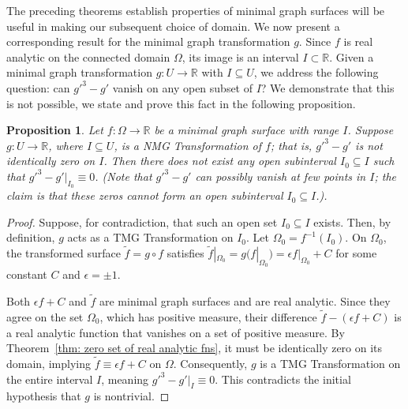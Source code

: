 \documentclass[12pt]{article}
\theoremstyle{plain}
\newtheorem{proposition}[theorem]{Proposition}
\theoremstyle{definition}
\theoremstyle{remark}
\begin{document}
  The preceding theorems establish properties of minimal graph surfaces will be useful in making our subsequent choice of domain. We now present a corresponding result for the minimal graph transformation \(g\). Since \(f\) is real analytic on the connected domain \(\Omega\), its image is an interval \(I \subset \mathbb{R}\). Given a minimal graph transformation \(g : U \longrightarrow \mathbb{R}\) with \(I \subseteq U\), we address the following question: can \(g\prime^3 - g\prime\) vanish on any open subset of \(I\)? We demonstrate that this is not possible, we state and prove this fact in the following proposition.
  
\begin{proposition}
	\label{thm: NTMGT is not locally trivial}
	Let \(f : \Omega \longrightarrow \mathbb{R}\) be a minimal graph surface with range \(I\). Suppose \(g : U \longrightarrow \mathbb{R}\), where \(I \subseteq U\), is a NMG Transformation of \(f\); that is, \(g\prime^3 - g\prime\) is not identically zero on \(I\). Then there does not exist any open subinterval \(I_0 \subseteq I\) such that \(g\prime^3 - g\prime|_{I_0} \equiv 0\). (Note that \(g\prime^3 - g\prime\) can possibly vanish at few points in \(I\); the claim is that these zeros cannot form an open subinterval \(I_0 \subseteq I\).).
\end{proposition}
 
  
  \begin{proof}
  	Suppose, for contradiction, that such an open set \(I_0 \subseteq I\) exists. Then, by definition, \(g\) acts as a TMG Transformation on \(I_0\). Let \(\Omega_0 = f^{-1}(I_0)\). On \(\Omega_0\), the transformed surface \(\tilde{f} = g \circ f\) satisfies \(\tilde{f}|_{\Omega_0} = g(f|_{\Omega_0}) = \epsilon f|_{\Omega_0} + C\) for some constant \(C\) and \(\epsilon = \pm 1\).
  	
  	Both \(\epsilon f + C\) and \(\tilde{f}\) are minimal graph surfaces and are real analytic. Since they agree on the set \(\Omega_0\), which has positive measure, their difference \(\tilde{f} - (\epsilon f + C)\) is a real analytic function that vanishes on a set of positive measure. By Theorem~\ref{thm: zero set of real analytic fns}, it must be identically zero on its domain, implying \(\tilde{f} \equiv \epsilon f + C\) on \(\Omega\). Consequently, \(g\) is a TMG Transformation on the entire interval \(I\), meaning \(g\prime^3 - g\prime|_I \equiv 0\). This contradicts the initial hypothesis that \(g\) is nontrivial.
  \end{proof}
\end{document}
